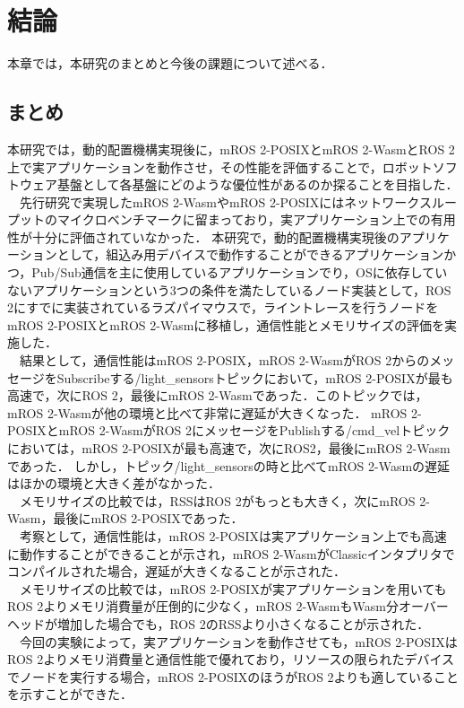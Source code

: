 \chapter{結論}
本章では，本研究のまとめと今後の課題について述べる．
\section{まとめ}
本研究では，動的配置機構実現後に，mROS 2-POSIXとmROS 2-WasmとROS 2上で実アプリケーションを動作させ，その性能を評価することで，ロボットソフトウェア基盤として各基盤にどのような優位性があるのか探ることを目指した．
\\　先行研究で実現したmROS 2-WasmやmROS 2-POSIXにはネットワークスループットのマイクロベンチマークに留まっており，実アプリケーション上での有用性が十分に評価されていなかった．
本研究で，動的配置機構実現後のアプリケーションとして，組込み用デバイスで動作することができるアプリケーションかつ，Pub/Sub通信を主に使用しているアプリケーションでり，OSに依存していないアプリケーションという3つの条件を満たしているノード実装として，ROS 2にすでに実装されているラズパイマウスで，ライントレースを行うノードをmROS 2-POSIXとmROS 2-Wasmに移植し，通信性能とメモリサイズの評価を実施した．
\\　結果として，通信性能はmROS 2-POSIX，mROS 2-WasmがROS 2からのメッセージをSubscribeする/light\_sensorsトピックにおいて，mROS 2-POSIXが最も高速で，次にROS 2，最後にmROS 2-Wasmであった．このトピックでは，mROS 2-Wasmが他の環境と比べて非常に遅延が大きくなった．
mROS 2-POSIXとmROS 2-WasmがROS 2にメッセージをPublishする/cmd\_velトピックにおいては，mROS 2-POSIXが最も高速で，次にROS2，最後にmROS 2-Wasmであった．
しかし，トピック/light\_sensorsの時と比べてmROS 2-Wasmの遅延はほかの環境と大きく差がなかった．
\\　メモリサイズの比較では，RSSはROS 2がもっとも大きく，次にmROS 2-Wasm，最後にmROS 2-POSIXであった．
\\　考察として，通信性能は，mROS 2-POSIXは実アプリケーション上でも高速に動作することができることが示され，mROS 2-WasmがClassicインタプリタでコンパイルされた場合，遅延が大きくなることが示された．
\\　メモリサイズの比較では，mROS 2-POSIXが実アプリケーションを用いてもROS 2よりメモリ消費量が圧倒的に少なく，mROS 2-WasmもWasm分オーバーヘッドが増加した場合でも，ROS 2のRSSより小さくなることが示された．
\\　今回の実験によって，実アプリケーションを動作させても，mROS 2-POSIXはROS 2よりメモリ消費量と通信性能で優れており，リソースの限られたデバイスでノードを実行する場合，mROS 2-POSIXのほうがROS 2よりも適していることを示すことができた．
